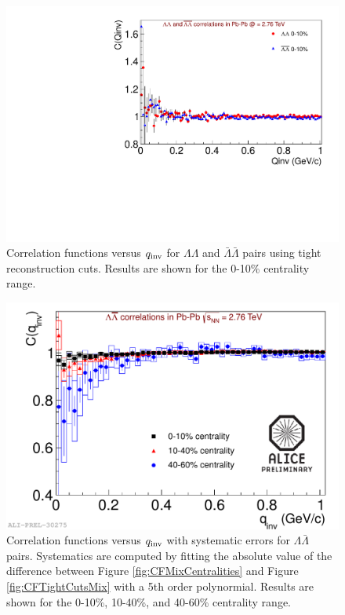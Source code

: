 \begin{figure}[hbtp]
\includegraphics[scale=0.7]{CFs_tightcut_note.pdf}
\caption[Correlation functions versus $q_{\rm inv}$ for $\Lambda\Lambda$ and $\bar{\Lambda}\bar{\Lambda}$ pairs.  Tight cuts]{Correlation functions versus $q_{\rm inv}$ for $\Lambda\Lambda$ and $\bar{\Lambda}\bar{\Lambda}$ pairs using tight reconstruction cuts.  Results are shown for the 0-10\% centrality range.}
\label{fig:CFTightCuts}
\end{figure}

\begin{figure}[hbtp]
\includegraphics[scale=0.7]{2012-Jul-25-LamALamPrelim.pdf}
\caption[Correlation functions versus $q_{\rm inv}$ for $\Lambda\bar{\Lambda}$ pairs in three centrality ranges with systematic errors.]{Correlation functions versus $q_{\rm inv}$ with systematic errors for $\Lambda\bar{\Lambda}$ pairs. Systematics are computed by fitting the absolute value of the difference between Figure \ref{fig:CFMixCentralities} and Figure \ref{fig:CFTightCutsMix} with a 5th order polynormial. Results are shown for the 0-10\%, 10-40\%, and 40-60\% centrality range.}
\label{fig:CFMixSystematics}
\end{figure}








%